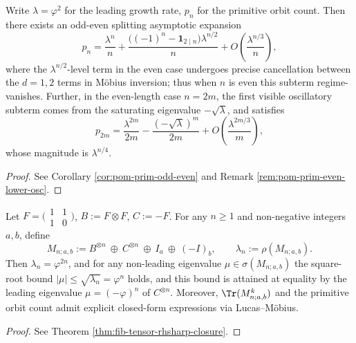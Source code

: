 \begin{conclusion}\label{con:xi-terminal-primitive-parity-cancellation}
Write \(\lambda=\varphi^2\) for the leading growth rate, \(p_n\) for the primitive orbit count.
Then there exists an odd-even splitting asymptotic expansion
\[
p_n=\frac{\lambda^n}{n}+\frac{\bigl((-1)^n-\mathbf{1}_{2\mid n}\bigr)\lambda^{n/2}}{n}
+O\!\left(\frac{\lambda^{n/3}}{n}\right),
\]
where the \(\lambda^{n/2}\)-level term in the even case undergoes precise cancellation between the \(d=1,2\) terms in Möbius inversion; thus when \(n\) is even this subterm regime-vanishes.
Further, in the even-length case \(n=2m\), the first visible oscillatory subterm comes from the saturating eigenvalue \(-\sqrt{\lambda}\), and satisfies
\[
p_{2m}=\frac{\lambda^{2m}}{2m}-\frac{(-\sqrt{\lambda})^{m}}{2m}+O\!\left(\frac{\lambda^{2m/3}}{m}\right),
\]
whose magnitude is \(\lambda^{n/4}\).
\end{conclusion}
\begin{proof}[Proof]
See Corollary \ref{cor:pom-prim-odd-even} and Remark \ref{rem:pom-prim-even-lower-osc}.
\end{proof}

\begin{conclusion}\label{con:xi-terminal-fib-tensor-rhsharp-generator}
Let
\(
F=\bigl(\begin{smallmatrix}1&1\\[2pt]1&0\end{smallmatrix}\bigr)
\), \(B:=F\otimes F\), \(C:=-F\).
For any \(n\ge 1\) and non-negative integers \(a,b\), define
\[
M_{n;a,b}:=B^{\otimes n}\ \oplus\ C^{\otimes n}\ \oplus\ I_a\ \oplus\ (-I)_b,
\qquad
\lambda_n:=\rho(M_{n;a,b}).
\]
Then \(\lambda_n=\varphi^{2n}\), and for any non-leading eigenvalue \(\mu\in\sigma(M_{n;a,b})\) the square-root bound \(|\mu|\le \sqrt{\lambda_n}=\varphi^n\) holds, and this bound is attained at equality by the leading eigenvalue \(\mu=(-\varphi)^n\) of \(C^{\otimes n}\).
Moreover, \(\Tr(M_{n;a,b}^k)\) and the primitive orbit count admit explicit closed-form expressions via Lucas--Möbius.
\end{conclusion}
\begin{proof}[Proof]
See Theorem \ref{thm:fib-tensor-rhsharp-closure}.
\end{proof}

